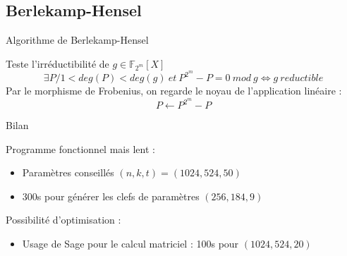 \documentclass{beamer}
\begin{document}
		\subsection{Berlekamp-Hensel}

			\begin{frame}{Algorithme de Berlekamp-Hensel}

				Teste l'irréductibilité de $ g \in \mathbb{F}_{2^{m}}[X] $
				$$
					\exists P / 1<deg(P)<deg(g) \ et \ P^{2^{m}} - P = 0 \ mod \ g \Leftrightarrow g \ reductible
				$$
				Par le morphisme de Frobenius, on regarde le noyau de l'application linéaire :
				$$
					P \leftarrow P^{2^{m}} - P
				$$
				
			\end{frame}



		\begin{frame}{Bilan}
			
			Programme fonctionnel mais lent :
			\begin{itemize}
				\item Paramètres conseillés $ (n,k,t) = (1024,524,50) $
				\item 300s pour générer les clefs de paramètres $ (256 ,184 ,9 ) $
			\end{itemize}

			Possibilité d'optimisation :
			\begin{itemize}
				\item Usage de Sage pour le calcul matriciel : 100s pour $(1024,524,20)$
			\end{itemize}


		\end{frame}
		
	    
\end{document}
